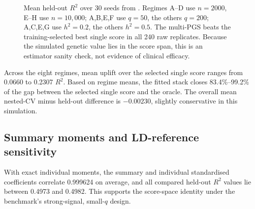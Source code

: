 \documentclass[10pt,a4paper]{article}
\newcommand{\Rtwo}{\(R^2\)}
\begin{document}
\begin{figure}[H]
\centering
{}
\caption{Mean held-out \Rtwo{} over 30 seeds from
\protect{}. Regimes A--D use
\(n=2000\), E--H use \(n=10{,}000\); A,B,E,F use \(q=50\), the others
\(q=200\); A,C,E,G use \(h^2=0.2\), the others \(h^2=0.5\). The multi-PGS
beats the training-selected best single score in all 240 raw replicates.
Because the simulated genetic value lies in the score span, this is an
estimator sanity check, not evidence of clinical efficacy.}
\label{fig:fit-accuracy}
\end{figure}

Across the eight regimes, mean uplift over the selected single score ranges
from 0.0660 to 0.2307 \Rtwo{}. Based on regime means, the fitted stack closes
83.4\%--99.2\% of the gap between the selected single score and the oracle.
The overall mean nested-CV minus held-out difference is \(-0.00230\), slightly
conservative in this simulation.

\subsection{Summary moments and LD-reference sensitivity}

With exact individual moments, the summary and individual standardised
coefficients correlate 0.999624 on average, and all compared held-out \Rtwo{}
values lie between 0.4973 and 0.4982. This supports the score-space identity
under the benchmark's strong-signal, small-\(q\) design.
\end{document}
